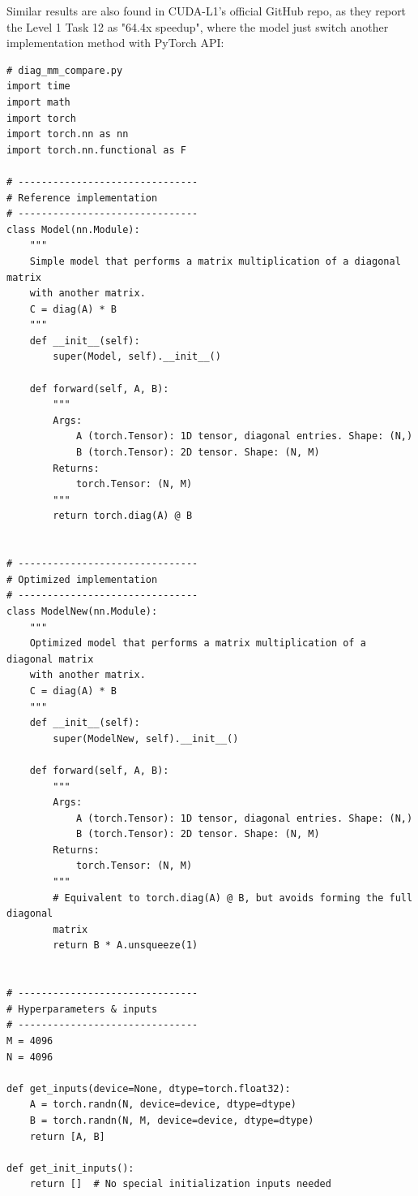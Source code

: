 Similar results are also found in CUDA-L1's official GitHub repo, as they report the Level 1 Task 12  as "64.4x speedup", where the model just switch another implementation method with PyTorch API:
\begin{tcolorbox}[redbox, title={Level 1 Task 12 — Reported $64.4\times$ Speedup by CUDA-L1}]
\tiny
\ttfamily
\begin{verbatim}
# diag_mm_compare.py
import time
import math
import torch
import torch.nn as nn
import torch.nn.functional as F

# -------------------------------
# Reference implementation
# -------------------------------
class Model(nn.Module):
    """
    Simple model that performs a matrix multiplication of a diagonal matrix 
    with another matrix.
    C = diag(A) * B
    """
    def __init__(self):
        super(Model, self).__init__()

    def forward(self, A, B):
        """
        Args:
            A (torch.Tensor): 1D tensor, diagonal entries. Shape: (N,)
            B (torch.Tensor): 2D tensor. Shape: (N, M)
        Returns:
            torch.Tensor: (N, M)
        """
        return torch.diag(A) @ B


# -------------------------------
# Optimized implementation
# -------------------------------
class ModelNew(nn.Module):
    """
    Optimized model that performs a matrix multiplication of a diagonal matrix
    with another matrix.
    C = diag(A) * B
    """
    def __init__(self):
        super(ModelNew, self).__init__()

    def forward(self, A, B):
        """
        Args:
            A (torch.Tensor): 1D tensor, diagonal entries. Shape: (N,)
            B (torch.Tensor): 2D tensor. Shape: (N, M)
        Returns:
            torch.Tensor: (N, M)
        """
        # Equivalent to torch.diag(A) @ B, but avoids forming the full diagonal 
        matrix
        return B * A.unsqueeze(1)


# -------------------------------
# Hyperparameters & inputs
# -------------------------------
M = 4096
N = 4096

def get_inputs(device=None, dtype=torch.float32):
    A = torch.randn(N, device=device, dtype=dtype)
    B = torch.randn(N, M, device=device, dtype=dtype)
    return [A, B]

def get_init_inputs():
    return []  # No special initialization inputs needed
\end{verbatim}
\normalfont
\end{tcolorbox}


